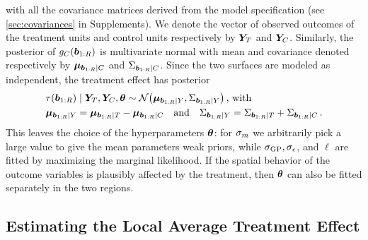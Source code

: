 \documentclass{article}
\newcommand{\autorefexternal}[1]{\autoref{#1}}
\begin{document}
with all the covariance matrices derived from the model specification (see \autorefexternal{sec:covariances} in Supplements).
We denote the vector of observed outcomes of the treatment units and control units respectively by \(\bm{Y}_{T}\) and \(\bm{Y}_{C}\).
Similarly, the posterior of \(g_C{}(\bm{b}_{1:R})\) is multivariate normal with mean and covariance denoted respectively by \(\bm{\mu}_{\bm{b}_{1:R} \mid C}\) and \(\Sigma_{\bm{b}_{1:R} \mid C}\).
Since the two surfaces are modeled as independent, the treatment effect has posterior
\begin{equation}
    \begin{split}
        & \tau(\sentinels) \mid \yt, \yc, \hyperparam \sim \normal\del{\muvec_{\sentinels \mid Y}, \Sigma_{\sentinels \mid Y}} \,\text{, with}\\
        & \muvec_{\sentinels \mid Y} = \muvec_{\sentinels \mid \treat} - \muvec_{\sentinels \mid \ctrol} \quad\text{and}\quad
        \Sigma_{\sentinels \mid Y} = \Sigma_{\sentinels \mid \treat} + \Sigma_{\sentinels \mid \ctrol} \,.
    \end{split}
    \label{eq:postvar2gp}
\end{equation}
This leaves the choice of the hyperparameters \(\bm{\theta}\):
for \(\sigma_{m}\) we arbitrarily pick a large value to give the mean parameters weak priors, while \(\sigma_{\mathrm{GP}},\sigma_{\epsilon}\), and \(\ell\) are fitted by maximizing the marginal likelihood.
If the spatial behavior of the outcome variables is plausibly affected by the treatment, then \(\bm{\theta}\) can also be fitted separately in the two regions.

\subsection{Estimating the Local Average Treatment Effect}
\label{sec:ate}
\end{document}
